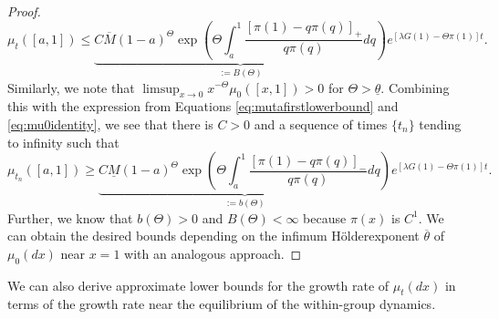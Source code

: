 \documentclass[11pt]{article}
\numberwithin{equation}{section}
\newcommand{\holder}{H{\"o}lder\:}
\newcommand{\supholderupperbound}[1]{B(#1)}
\newcommand{\supholderlowerbound}[1]{b(#1)}
\begin{document}
{\begin{proof}
\begin{equation} \label{eq:mutaupperbound}
    \mu_t\left(\left[a,1\right]\right) \leq \underbrace{C \overline{M} \left(1-a\right)^{\Theta} \exp\left( \Theta \int_{a}^{1} \frac{\left[\pi(1) - q \pi(q)\right]_+}{q \pi(q)} dq\right)}_{:= \supholderupperbound{\Theta}} e^{\left[\lambda G(1) - \Theta \pi(1) \right]t}.
\end{equation}
Similarly, we note that $\limsup_{x \to 0} x^{-\Theta} \mu_0\left(\left[x,1\right]\right) > 0$ for $\Theta > \underline{\theta}$. Combining this with the expression from Equations \eqref{eq:mutafirstlowerbound} and \eqref{eq:mu0identity}, we see that there is $C > 0$ and a sequence of times $\{t_n\}$ tending to infinity such that
\begin{equation} \label{eq:mutasequentiallowerbound}
    \mu_{t_n}\left(\left[a,1\right]\right) \geq \underbrace{C \underline{M} \left(1-a\right)^{\Theta} \exp\left(\Theta \int_{a}^{1} \frac{\left[\pi(1) - q \pi(q)\right]_-}{q \pi(q)} dq\right)}_{:= \supholderlowerbound{\Theta}} e^{\left[\lambda G(1) - \Theta \pi(1) \right]t}.
\end{equation}
Further, we know that $\supholderlowerbound{\Theta} > 0$ and $\supholderupperbound{\Theta} < \infty$ because $\pi(x)$ is $C^1$. We can obtain the desired bounds depending on the infimum \holder exponent $\overline{\theta}$ of $\mu_0(dx)$ near $x=1$ with an analogous approach.
\end{proof}

We can also derive approximate lower bounds for the growth rate of $\mu_t(dx)$ in terms of the growth rate near the equilibrium of the within-group dynamics.



}
\end{document}
